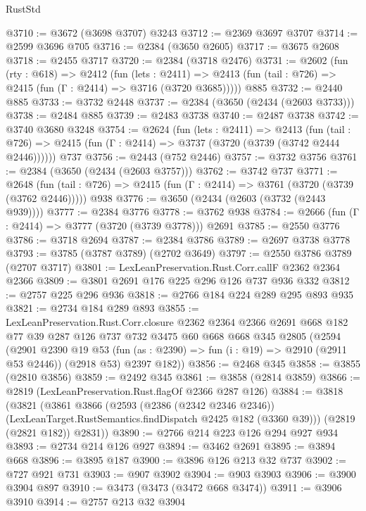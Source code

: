 \begin{lexlean}{RustStd}
\begin{coremodule}
@3710 := @3672 (@3698 @3707) @3243
@3712 := @2369 @3697 @3707
@3714 := @2599 @3696 @705
@3716 := @2384 (@3650 @2605)
@3717 := @3675 @2608
@3718 := @2455 @3717
@3720 := @2384 (@3718 @2476)
@3731 := @2602
    (fun (rty : @618) =>
    @2412
      (fun (lets : @2411) =>
      @2413 (fun (tail : @726) => @2415 (fun (Γ : @2414) => @3716 (@3720 @3685)))))
    @885
@3732 := @2440 @885
@3733 := @3732 @2448
@3737 := @2384 (@3650 (@2434 (@2603 @3733)))
@3738 := @2484 @885
@3739 := @2483 @3738
@3740 := @2487 @3738
@3742 := @3740 @3680 @3248
@3754 := @2624
    (fun (lets : @2411) =>
    @2413
      (fun (tail : @726) => @2415 (fun (Γ : @2414) => @3737 (@3720 (@3739 (@3742 @2444 @2446))))))
    @737
@3756 := @2443 (@752 @2446)
@3757 := @3732 @3756
@3761 := @2384 (@3650 (@2434 (@2603 @3757)))
@3762 := @3742 @737
@3771 := @2648
    (fun (tail : @726) => @2415 (fun (Γ : @2414) => @3761 (@3720 (@3739 (@3762 @2446)))))
    @938
@3776 := @3650 (@2434 (@2603 (@3732 (@2443 @939))))
@3777 := @2384 @3776
@3778 := @3762 @938
@3784 := @2666 (fun (Γ : @2414) => @3777 (@3720 (@3739 @3778))) @2691
@3785 := @2550 @3776
@3786 := @3718 @2694
@3787 := @2384 @3786
@3789 := @2697 @3738 @3778
@3793 := @3785 (@3787 @3789) (@2702 @3649)
@3797 := @2550 @3786 @3789 (@2707 @3717)
@3801 := LexLeanPreservation.Rust.Corr.callF @2362 @2364 @2366
@3809 := @3801 @2691 @176 @225 @296 @126 @737 @936 @332
@3812 := @2757 @225 @296 @936
@3818 := @2766 @184 @224 @289 @295 @893 @935
@3821 := @2734 @184 @289 @893
@3855 := LexLeanPreservation.Rust.Corr.closure
    @2362
    @2364
    @2366
    @2691
    @668
    @182
    @77
    @39
    @287
    @126
    @737
    @732
    @3475
    @60
    @668
    @668
    @345
    @2805
    (@2594
      (@2901
        @2390
        @19
        @53
        (fun (as : @2390) => fun (i : @19) => @2910 (@2911 @53 @2446))
        (@2918 @53)
        @2397
        @182))
@3856 := @2468 @345
@3858 := @3855 (@2810 @3856)
@3859 := @2492 @345
@3861 := @3858 (@2814 @3859)
@3866 := @2819 (LexLeanPreservation.Rust.flagOf @2366 @287 @126)
@3884 := @3818
    (@3821
      (@3861
        @3866
        (@2593
          (@2386 (@2342 @2346 @2346))
          (LexLeanTarget.RustSemantics.findDispatch @2425 @182 (@3360 @39)))
        (@2819 (@2821 @182))
        @2831))
@3890 := @2766 @214 @223 @126 @294 @927 @934
@3893 := @2734 @214 @126 @927
@3894 := @3462 @2691
@3895 := @3894 @668
@3896 := @3895 @187
@3900 := @3896 @126 @213 @32 @737
@3902 := @727 @921 @731
@3903 := @907 @3902
@3904 := @903 @3903
@3906 := @3900 @3904 @897
@3910 := @3473 (@3473 (@3472 @668 @3474))
@3911 := @3906 @3910
@3914 := @2757 @213 @32 @3904

\end{coremodule}
\end{lexlean}
